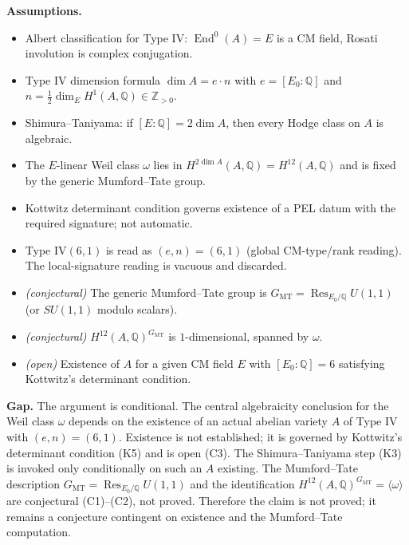 \documentclass{article}
\begin{document}
\medskip
\noindent\textbf{Assumptions.}
\begin{itemize}
\item[(K1)] Albert classification for Type IV: \(\operatorname{End}^0(A) = E\) is a CM field, Rosati involution is complex conjugation.
\item[(K2)] Type IV dimension formula \(\dim A = e\cdot n\) with \(e = [E_0:\mathbb{Q}]\) and \(n = \tfrac12 \dim_E H^1(A,\mathbb{Q}) \in \mathbb{Z}_{>0}\).
\item[(K3)] Shimura--Taniyama: if \([E:\mathbb{Q}] = 2\dim A\), then every Hodge class on \(A\) is algebraic.
\item[(K4)] The \(E\)-linear Weil class \(\omega\) lies in \(H^{2\dim A}(A,\mathbb{Q}) = H^{12}(A,\mathbb{Q})\) and is fixed by the generic Mumford--Tate group.
\item[(K5)] Kottwitz determinant condition governs existence of a PEL datum with the required signature; not automatic.
\item[Convention] Type IV\((6,1)\) is read as \((e,n) = (6,1)\) (global CM-type/rank reading). The local-signature reading is vacuous and discarded.
\item[(C1)] \emph{(conjectural)} The generic Mumford--Tate group is \(G_{\mathrm{MT}} = \operatorname{Res}_{E_0/\mathbb{Q}} U(1,1)\) (or \(SU(1,1)\) modulo scalars).
\item[(C2)] \emph{(conjectural)} \(H^{12}(A,\mathbb{Q})^{G_{\mathrm{MT}}}\) is \(1\)-dimensional, spanned by \(\omega\).
\item[(C3)] \emph{(open)} Existence of \(A\) for a given CM field \(E\) with \([E_0:\mathbb{Q}] = 6\) satisfying Kottwitz's determinant condition.
\end{itemize}

\medskip
\noindent\textbf{Gap.}
The argument is conditional. The central algebraicity conclusion for the Weil class \(\omega\) depends on the existence of an actual abelian variety \(A\) of Type IV with \((e,n) = (6,1)\). Existence is not established; it is governed by Kottwitz's determinant condition (K5) and is open (C3). The Shimura--Taniyama step (K3) is invoked only conditionally on such an \(A\) existing. The Mumford--Tate description \(G_{\mathrm{MT}} = \operatorname{Res}_{E_0/\mathbb{Q}} U(1,1)\) and the identification \(H^{12}(A,\mathbb{Q})^{G_{\mathrm{MT}}} = \langle \omega \rangle\) are conjectural (C1)--(C2), not proved. Therefore the claim is not proved; it remains a conjecture contingent on existence and the Mumford--Tate computation.
\end{document}
